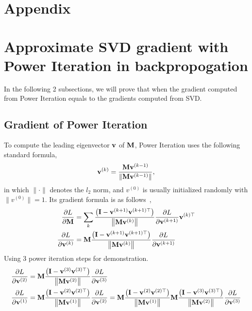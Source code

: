 
\section{Appendix}
\label{sec:appendix}
\section{Approximate SVD gradient with Power Iteration in backpropogation}
In the following 2 subsections, we will prove that when the gradient computed from Power Iteration equals to the gradients computed from SVD.
	\subsection{Gradient of Power Iteration}
	\label{sec: pi}
	To compute the leading eigenvector $\mathbf{v}$ of $\mathbf{M}$, Power Iteration uses the following standard formula,
	\begin{equation}
	\mathbf{v}^{(k)} = \frac{\mathbf{M}\mathbf{v}^{(k-1)}}{\| \mathbf{M}\mathbf{v}^{(k-1)} \|},
	\end{equation}
	in which $\| {\cdot} \|$ denotes the $l_2$ norm, and $v^{(0)}$ is usually initialized randomly with  $\|v^{(0)}\|{=}1$.
    Its gradient formula is as follows~\cite{ye2017dynamic},
	\begin{equation}
	\begin{aligned} 
	\frac{\partial L}{\partial \mathbf{M}} &=\sum_{k} \frac{\left(\mathbf{I}-\mathbf{v}^{(k+1)} \mathbf{v}^{(k+1)\top}\right)}{\left\|\mathbf{M} \mathbf{v}^{(k)}\right\|} \frac{\partial L}{\partial \mathbf{v}^{(k+1)}} \mathbf{v}^{(k)\top} \\
	\frac{\partial L}{\partial \mathbf{v}^{(k)}} &=\mathbf{M} \frac{\left(\mathbf{I}-\mathbf{v}^{(k+1)} \mathbf{v}^{(k+1)\top}\right)}{\left\|\mathbf{M} \mathbf{v}^{(k)}\right\|} \frac{\partial L}{\partial \mathbf{v}^{(k+1)}} 
	\end{aligned}
	\end{equation}
	Using 3 power iteration steps for demonstration.
	\begin{equation}
	\begin{aligned} 
	\frac{\partial L}{\partial \mathbf{v}^{(2)}} &=\mathbf{M} \frac{\left(\mathbf{I}-\mathbf{v}^{(3)} \mathbf{v}^{(3)\top}\right)}{\left\|\mathbf{M} \mathbf{v}^{(2)}\right\|} \frac{\partial L}{\partial \mathbf{v}^{(3)}}\\
	\frac{\partial L}{\partial \mathbf{v}^{(1)}} &=\mathbf{M} \frac{\left(\mathbf{I}-\mathbf{v}^{(2)} \mathbf{v}^{(2)\top}\right)}{\left\|\mathbf{M} \mathbf{v}^{(1)}\right\|} \frac{\partial L}{\partial \mathbf{v}^{(2)}}
	=\mathbf{M} \frac{\left(\mathbf{I}-\mathbf{v}^{(2)} \mathbf{v}^{(2)\top}\right)}{\left\|\mathbf{M} \mathbf{v}^{(1)}\right\|} 
	\mathbf{M} \frac{\left(\mathbf{I}-\mathbf{v}^{(3)} \mathbf{v}^{(3)\top}\right)}{\left\|\mathbf{M} \mathbf{v}^{(2)}\right\|} \frac{\partial L}{\partial \mathbf{v}^{(3)}}
	\end{aligned}
	\end{equation}
	
